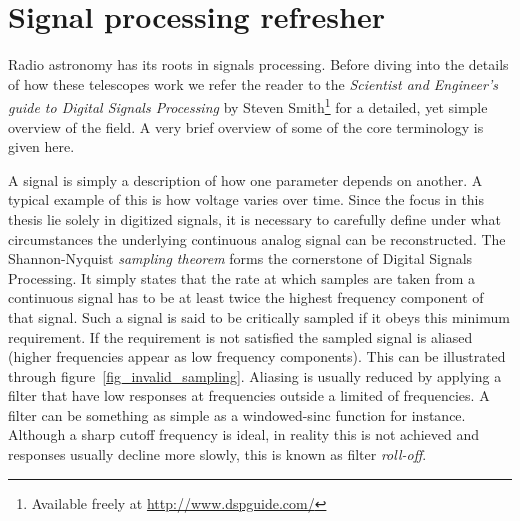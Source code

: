 \chapter{Signal processing refresher} \label{chp_DSP}
Radio astronomy has its roots in signals processing. Before diving into the details of how these telescopes work we refer the reader to the \textit{Scientist and Engineer's guide to Digital Signals Processing} by 
Steven Smith\footnote{Available freely at \url{http://www.dspguide.com/}}\cite{smith1997scientist} for a detailed, yet simple overview of the field. A very brief overview of some of the core terminology is given here.

A signal is simply a description of how one parameter depends on another. A typical example of this is how voltage varies over time. Since the focus in this thesis lie solely in digitized signals, it is necessary to carefully
define under what circumstances the underlying continuous analog signal can be reconstructed. The Shannon-Nyquist \textit{sampling theorem} forms the cornerstone of Digital Signals Processing. It simply states that the rate at
which samples are taken from a continuous signal has to be at least twice the highest frequency component of that signal. Such a signal is said to be critically sampled if it obeys this minimum requirement. If the requirement is
not satisfied the sampled signal is aliased (higher frequencies appear as low frequency components). This can be illustrated through figure~\ref{fig_invalid_sampling}. Aliasing is usually reduced by applying a filter that
have low responses at frequencies outside a limited  of frequencies. A filter can be something as simple as a windowed-sinc function for instance. Although a sharp cutoff frequency is ideal, in reality 
this is not achieved and responses usually decline more slowly, this is known as filter \textit{roll-off}.

